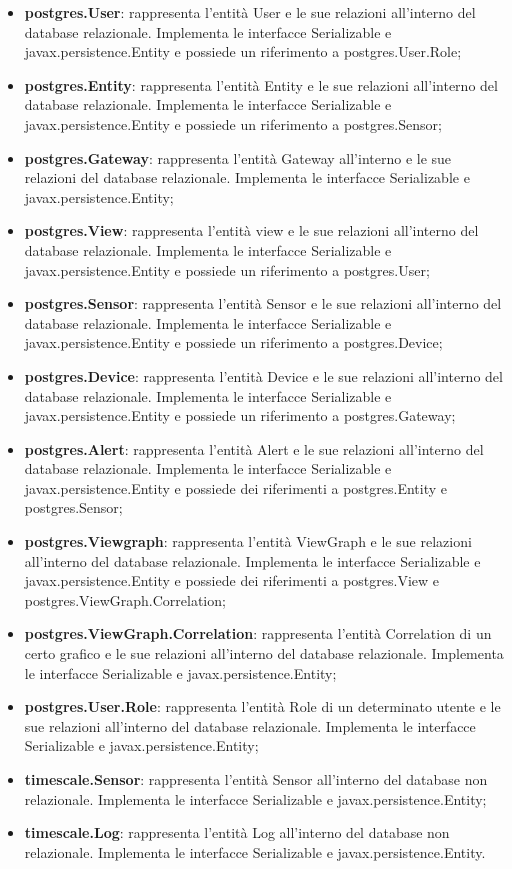 		\begin{itemize}
		 	\item \textbf{postgres.User}: rappresenta l'entità User e le sue relazioni all'interno del database relazionale. Implementa le interfacce Serializable e javax.persistence.Entity e possiede un riferimento a postgres.User.Role;
		 	\item \textbf{postgres.Entity}: rappresenta l'entità Entity e le sue relazioni all'interno del database relazionale. Implementa le interfacce Serializable e javax.persistence.Entity e possiede un riferimento a postgres.Sensor;
		 	\item \textbf{postgres.Gateway}: rappresenta l'entità Gateway all'interno e le sue relazioni del database relazionale. Implementa le interfacce Serializable e javax.persistence.Entity;
		 	\item \textbf{postgres.View}: rappresenta l'entità view e le sue relazioni all'interno del database relazionale. Implementa le interfacce Serializable e javax.persistence.Entity e possiede un riferimento a postgres.User;
		 	\item \textbf{postgres.Sensor}: rappresenta l'entità Sensor e le sue relazioni all'interno del database relazionale. Implementa le interfacce Serializable e javax.persistence.Entity e possiede un riferimento a postgres.Device;
		 	\item \textbf{postgres.Device}: rappresenta l'entità Device e le sue relazioni all'interno del database relazionale. Implementa le interfacce Serializable e javax.persistence.Entity e possiede un riferimento a postgres.Gateway;
		 	\item \textbf{postgres.Alert}: rappresenta l'entità Alert e le sue relazioni all'interno del database relazionale. Implementa le interfacce Serializable e javax.persistence.Entity e possiede dei riferimenti a postgres.Entity e postgres.Sensor;
		 	\item \textbf{postgres.Viewgraph}: rappresenta l'entità ViewGraph e le sue relazioni all'interno del database relazionale. Implementa le interfacce Serializable e javax.persistence.Entity e possiede dei riferimenti a postgres.View e postgres.ViewGraph.Correlation;
		 	\item \textbf{postgres.ViewGraph.Correlation}: rappresenta l'entità Correlation di un certo grafico e le sue relazioni all'interno del database relazionale. Implementa le interfacce Serializable e javax.persistence.Entity;
		 	\item \textbf{postgres.User.Role}: rappresenta l'entità Role di un determinato utente e le sue relazioni all'interno del database relazionale. Implementa le interfacce Serializable e javax.persistence.Entity;
		 	\item \textbf{timescale.Sensor}: rappresenta l'entità Sensor all'interno del database non relazionale. Implementa le interfacce Serializable e javax.persistence.Entity;
		 	\item \textbf{timescale.Log}: rappresenta l'entità Log all'interno del database non relazionale. Implementa le interfacce Serializable e javax.persistence.Entity.
		 \end{itemize} 
